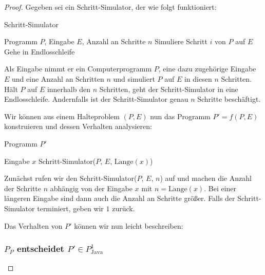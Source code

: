 \documentclass[journal]{IEEEtran}
\begin{document}
\begin{proof}
Gegeben sei ein Schritt-Simulator, der wie folgt funktioniert:

\begin{algorithm}
\caption{Schritt-Simulator}
\begin{algorithmic}[1]
\renewcommand{\algorithmicrequire}{\textbf{Input:}}
\renewcommand{\algorithmicensure}{\textbf{Output:}}
\REQUIRE Programm $P$, Eingabe $E$, Anzahl an Schritte $n$
  \STATE Simuliere Schritt $i$ von $P$ auf $E$
   \STATE Gehe in Endlosschleife
  \ENDIF
 \ENDFOR
\end{algorithmic}
\end{algorithm}

Als Eingabe nimmt er ein Computerprogramm $P$, eine dazu zugehörige Eingabe $E$ und eine Anzahl an Schritten $n$ und simuliert $P$ auf $E$ in diesen $n$ Schritten. Hält $P$ auf $E$ innerhalb den $n$ Schritten, geht der Schritt-Simulator in eine Endlosschleife. Andernfalls ist der Schritt-Simulator genau $n$ Schritte beschäftigt.

Wir können aus einem Halteproblem $(P, E)$ nun das Programm $P' = f(P, E)$ konstruieren und dessen Verhalten analysieren:

\begin{algorithm}
\caption{Programm $P'$}
\begin{algorithmic}[1]
\renewcommand{\algorithmicrequire}{\textbf{Input:}}
\renewcommand{\algorithmicensure}{\textbf{Output:}}
\REQUIRE Eingabe $x$
\STATE Schritt-Simulator($P$, $E$, $\operatorname{L\ddot{a}nge}(x)$)
\end{algorithmic}
\end{algorithm}

Zunächst rufen wir den Schritt-Simulator($P$, $E$, $n$) auf und machen die Anzahl der Schritte $n$ abhängig von der Eingabe $x$ mit $n = \operatorname{L\ddot{a}nge}(x)$. Bei einer längeren Eingabe sind dann auch die Anzahl an Schritte größer. Falls der Schritt-Simulator terminiert, geben wir $1$ zurück.

Das Verhalten von $P'$ können wir nun leicht beschreiben:

\subsubsection{$P_P$ entscheidet $P' \in P_\text{Java}^1$}


\end{proof}
\end{document}
